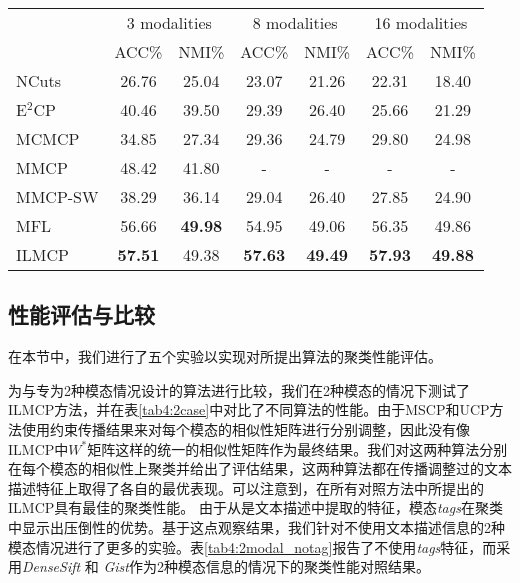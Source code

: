 \begin{table}[t]
    \label{tab4:modal2}
    \centering
    \setlength{\tabcolsep}{8pt}
    \begin{tabular}{l*{6}{c}}
        \toprule
        &\multicolumn{2}{c}{3 modalities} & \multicolumn{2}{c}{8 modalities} & \multicolumn{2}{c}{16 modalities}\\
        \cmidrule(lr){2-3}
        \cmidrule(lr){4-5}
        \cmidrule(lr){6-7}
        & ACC\% & NMI\% & ACC\% & NMI\% & ACC\% & NMI\%  \\
        \midrule
        NCuts  & 26.76 & 25.04 & 23.07 & 21.26 & 22.31 & 18.40  \\ 
        E$^2$CP  & 40.46 & 39.50 & 29.39 & 26.40 & 25.66 & 21.29 \\ 
        MCMCP & 34.85 & 27.34 & 29.36 & 24.79 & 29.80 & 24.98  \\ 
        MMCP  & 48.42 & 41.80 & - & - & - & - \\ 
        MMCP-SW & 38.29 & 36.14 & 29.04 & 26.40 & 27.85 & 24.90 \\ 
        MFL  & {56.66} & \textbf{49.98} & {54.95} & {49.06} & {56.35} &{49.86}\\
        ILMCP & \textbf{57.51} & {49.38} & \textbf{57.63} & \textbf{49.49} & \textbf{57.93} & \textbf{49.88} \\
        \bottomrule
    \end{tabular}
\end{table}

\subsection{性能评估与比较}
在本节中，我们进行了五个实验以实现对所提出算法的聚类性能评估。

为与专为2种模态情况设计的算法进行比较，我们在2种模态的情况下测试了ILMCP方法，并在表\ref{tab4:2case}中对比了不同算法的性能。由于MSCP和UCP方法使用约束传播结果来对每个模态的相似性矩阵进行分别调整，因此没有像ILMCP中${W^*}$矩阵这样的统一的相似性矩阵作为最终结果。我们对这两种算法分别在每个模态的相似性上聚类并给出了评估结果，这两种算法都在传播调整过的文本描述特征上取得了各自的最优表现。可以注意到，在所有对照方法中所提出的ILMCP具有最佳的聚类性能。
由于从是文本描述中提取的特征，模态\textit{tags}在聚类中显示出压倒性的优势。基于这点观察结果，我们针对不使用文本描述信息的2种模态情况进行了更多的实验。表\ref{tab4:2modal_notag}报告了不使用\textit{tags}特征，而采用\textit{DenseSift} 和 \textit{Gist}作为2种模态信息的情况下的聚类性能对照结果。

